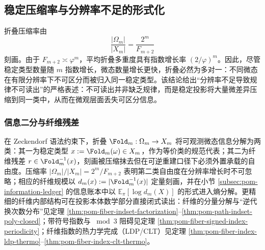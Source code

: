 \subsection{稳定压缩率与分辨率不足的形式化}

折叠压缩率由
\[
\frac{|\Omega_m|}{|X_m|}=\frac{2^m}{F_{m+2}}
\]
刻画。由于 $F_{m+2}\asymp \varphi^m$，平均折叠多重度具有指数增长率 $(2/\varphi)^m$。因此，尽管稳定类型数量随 $m$ 指数增长，微态数量增长更快，折叠必然为多对一：不同微态在有限分辨率下不可区分而被归入同一稳定类型。该结论给出“分辨率不足导致规律不可读出”的严格表述：不可读出并非缺乏规律，而是稳定投影将大量微差异压缩到同一类中，从而在微观层面丢失可区分信息。

\subsubsection{信息二分与纤维残差}
在 Zeckendorf 语法约束下，折叠 $\Fold_m:\Omega_m\to X_m$ 将可观测微态信息分解为两类：其一为稳定类型 $x:=\Fold_m(\omega)\in X_m$，作为等价类的规范代表；其二为纤维残差 $r\in \Fold_m^{-1}(x)$，刻画被压缩抹去但在可逆重建口径下必须外置承载的自由度。压缩率 $|\Omega_m|/|X_m|=2^m/F_{m+2}$ 表明第二类自由度在分辨率增长时不可忽略；相应的纤维规模以 $d_m(x):=|\Fold_m^{-1}(x)|$ 定量刻画，并在小节 \ref{subsec:pom-information-ledger} 的信息账本中以 $\mathbb{E}_{\pi}[\log d_m(X)]$ 的形式进入熵分解。更精细的纤维内部结构可在投影本体数学部分直接闭式读出：纤维的分量分解与“逆代换次数分布”见定理 \ref{thm:pom-fiber-indset-factorization}--\ref{thm:pom-path-indset-poly-closed}；带符号指数与 \(\bmod 3\) 阻碍见定理 \ref{thm:pom-fiber-signed-index-periodicity}；纤维指数的热力学完成（LDP/CLT）见定理 \ref{thm:pom-fiber-index-ldp-thermo}--\ref{thm:pom-fiber-index-clt-thermo}。
